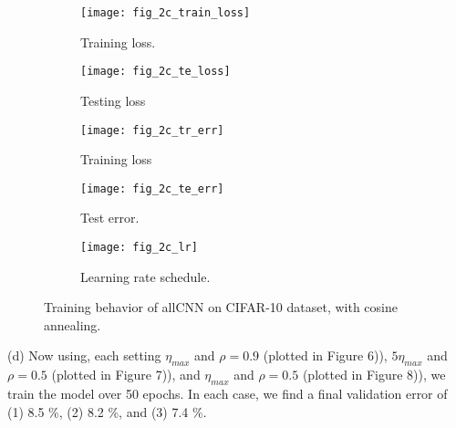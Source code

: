 \documentclass[12pt]{article}
\begin{document}
 \begin{figure}
     \centering
     \begin{subfigure}[b]{0.3\textwidth}
         \centering
         \texttt{[image: fig\_2c\_train\_loss]}
         \caption{Training loss. }
         \label{fig:y equals x}
     \end{subfigure}
     \hfill
     \begin{subfigure}[b]{0.3\textwidth}
         \centering
         \texttt{[image: fig\_2c\_te\_loss]}
         \caption{Testing loss}
         \label{fig:three sin x}
     \end{subfigure}
     \hfill
     \begin{subfigure}[b]{0.3\textwidth}
         \centering
         \texttt{[image: fig\_2c\_tr\_err]}
         \caption{Training loss}
         \label{fig:five over x}
     \end{subfigure}
      \begin{subfigure}[b]{0.3\textwidth}
         \centering
         \texttt{[image: fig\_2c\_te\_err]}
         \caption{Test error. }
         \label{fig:y equals x}
     \end{subfigure}
     \hfill
     \begin{subfigure}[b]{0.3\textwidth}
         \centering
         \texttt{[image: fig\_2c\_lr]}
         \caption{Learning rate schedule. }
         \label{fig:y equals x}
     \end{subfigure}
     \hfil
        \caption{Training behavior of allCNN on CIFAR-10 dataset, with cosine annealing. }
        \label{fig:three graphs}
\end{figure}
 (d) Now using,  each setting $\eta_{max}$ and $\rho = 0.9$ (plotted in Figure 6)), $ 5\eta_{max}$ and $\rho = 0.5$ (plotted in Figure 7)), and  $\eta_{max}$ and $\rho = 0.5$ (plotted in Figure 8)), we train the model over 50 epochs. In each case, we find a final validation error of (1) 8.5 \%,   (2)    8.2  \%, and (3)   7.4 \%.  \newline 
 
\end{document}

